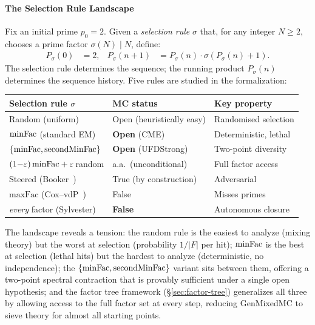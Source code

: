 \paragraph{The Selection Rule Landscape}
\label{sec:selection-landscape}

Fix an initial prime $p_0 = 2$.  Given a \emph{selection rule}
$\sigma$ that, for any integer $N \geq 2$, chooses a prime factor
$\sigma(N) \mid N$, define:
\begin{align}
  P_\sigma(0) &= 2, &
  P_\sigma(n{+}1) &= P_\sigma(n) \cdot \sigma(P_\sigma(n)+1).
\end{align}
The selection rule determines the sequence; the running product
$P_\sigma(n)$ determines the sequence history.
Five rules are studied in the formalization:

\smallskip
\begin{center}
\begin{tabular}{@{}l@{\quad}l@{\quad}l@{}}
\toprule
\textbf{Selection rule} $\sigma$ & \textbf{MC status} & \textbf{Key property} \\
\midrule
Random (uniform) & Open (heuristically easy) & Randomised selection \\
$\mathrm{minFac}$ (standard EM) & \textbf{Open} (CME) & Deterministic, lethal \\
$\{\mathrm{minFac}, \operatorname{secondMinFac}\}$ & \textbf{Open} (UFDStrong) & Two-point diversity \\
$(1{-}\varepsilon)\,\mathrm{minFac} + \varepsilon\,$random & a.a.\ (unconditional) & Full factor access \\
Steered (Booker~\cite{BoSa2012}) & True (by construction) & Adversarial \\
$\mathrm{maxFac}$ (Cox--vdP~\cite{CoxVdP1968}) & False & Misses primes \\
\emph{every} factor (Sylvester) & \textbf{False} & Autonomous closure \\
\bottomrule
\end{tabular}
\end{center}

\smallskip\noindent
The landscape reveals a tension: the random rule is the easiest to
analyze (mixing theory) but the worst at selection (probability
$1/|F|$ per hit); $\mathrm{minFac}$ is the best at selection (lethal hits)
but the hardest to analyze (deterministic, no independence); the
$\{\mathrm{minFac}, \operatorname{secondMinFac}\}$ variant sits between them,
offering a two-point spectral contraction that is provably sufficient
under a single open hypothesis; and the factor tree framework
(\S\ref{sec:factor-tree}) generalizes all three by allowing access
to the full factor set at every step, reducing GenMixedMC to sieve
theory for almost all starting points.


